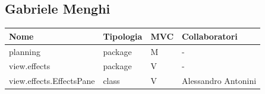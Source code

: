 \documentclass[a4paper,12pt]{report}
\begin{document}
\subsection{Gabriele Menghi}
\begin{center}
\begin{longtable}{| m{22.5em} | m{2cm}| m{1cm} | m{2.7cm} |} 
 \hline
 \textbf{Nome} & \textbf{Tipologia} & \textbf{MVC} & \textbf{Collaboratori} \\ [0.5ex]
 \hline
  planning & package & M & - \\
 \hline
 view.effects & package & V & - \\
 \hline
view.effects.EffectsPane & class & V & Alessandro Antonini \\
\hline
 \end{longtable}
 \end{center}
\end{document}
